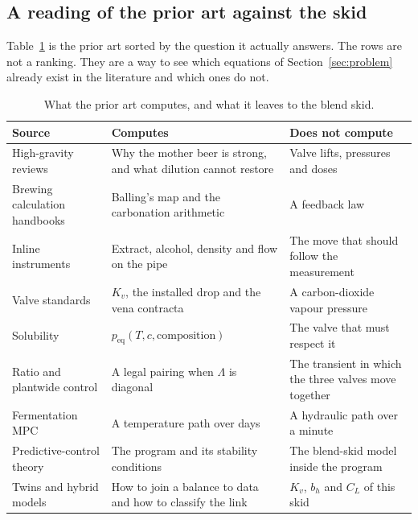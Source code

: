 \subsection{A reading of the prior art against the skid}

Table~\ref{tab:prior} is the prior art sorted by the question it actually answers. The rows are not a ranking. They are a way to see which equations of Section~\ref{sec:problem} already exist in the literature and which ones do not.

\begin{table}[htbp]
\centering
\caption{What the prior art computes, and what it leaves to the blend skid.}
\label{tab:prior}
\small
\begin{tabular}{@{}p{}p{}p{}@{}}
\toprule
Source & Computes & Does not compute \\
\midrule
High-gravity reviews \citep{stewart2010,stewart2013,puligundla2011} &
Why the mother beer is strong, and what dilution cannot restore &
Valve lifts, pressures and doses \\
Brewing calculation handbooks \citep{kunze2019,holle2003,briggs2004} &
Balling's map and the carbonation arithmetic &
A feedback law \\
Inline instruments \citep{antonpaar2024,schoeck2012,wang2014} &
Extract, alcohol, density and flow on the pipe &
The move that should follow the measurement \\
Valve standards \citep{iec60534,isa75,fisher2005} &
$K_v$, the installed drop and the vena contracta &
A carbon-dioxide vapour pressure \\
Solubility \citep{speers2013,rammert1991,findlay1911} &
$p_{\mathrm{eq}}(T,c,\text{composition})$ &
The valve that must respect it \\
Ratio and plantwide control \citep{shinskey1996,bristol1966,skogestad2004} &
A legal pairing when $\Lambda$ is diagonal &
The transient in which the three valves move together \\
Fermentation MPC \citep{gee1994,trelea2004,rodman2016} &
A temperature path over days &
A hydraulic path over a minute \\
Predictive-control theory \citep{qin2003,mayne2000,rawlings2017,grune2017} &
The program and its stability conditions &
The blend-skid model inside the program \\
Twins and hybrid models \citep{kritzinger2018,raissi2019,zheng2023,goffi2025} &
How to join a balance to data and how to classify the link &
$K_v$, $b_h$ and $C_L$ of this skid \\
\bottomrule
\end{tabular}
\end{table}

